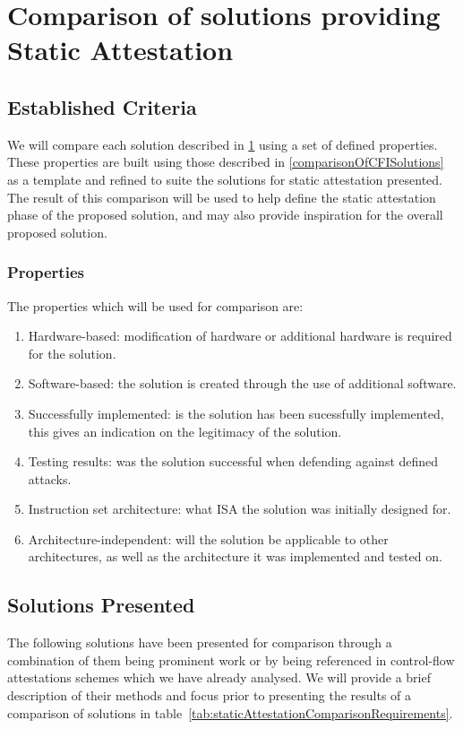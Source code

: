 \section{Comparison of solutions providing Static Attestation} \label{staticAttestationSolutions}

\subsection{Established Criteria}

We will compare each solution described in \ref{staticAttestationSolutions} using a set of defined properties. These properties are built using those described in \ref{comparisonOfCFISolutions} as a template and refined to suite the solutions for static attestation presented. The result of this comparison will be used to help define the static attestation phase of the proposed solution, and may also provide inspiration for the overall proposed solution.

\subsubsection*{Properties}
The properties which will be used for comparison are:
\begin{enumerate}[label=(\arabic*),noitemsep]
	\item Hardware-based: modification of hardware or additional hardware is required for the solution.			\item Software-based: the solution is created through the use of additional software.
	\item Successfully implemented: is the solution has been sucessfully implemented, this gives an indication on the legitimacy of the solution.
	\item Testing results: was the solution successful when defending against defined attacks.
	\item Instruction set architecture: what ISA the solution was initially designed for.
	\item Architecture-independent: will the solution be applicable to other architectures, as well as the architecture it was implemented and tested on.
\end{enumerate}

\subsection{Solutions Presented}

The following solutions have been presented for comparison through a combination of them being prominent work or by being referenced in control-flow attestations schemes which we have already analysed. We will provide a brief description of their methods and focus prior to presenting the results of a comparison of solutions in table~\ref{tab:staticAttestationComparisonRequirements}.

